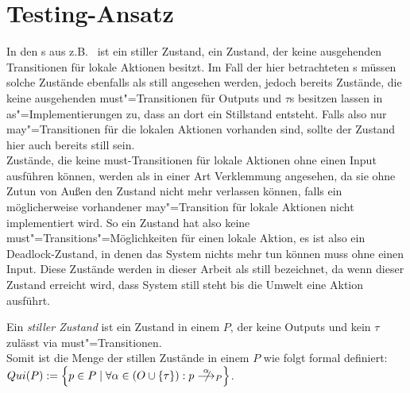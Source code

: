 \section{Testing-Ansatz}

In den \EIO{}s aus z.B.~\cite{Schinko2016BA} ist ein stiller Zustand, ein
Zustand, der keine ausgehenden Transitionen für lokale Aktionen besitzt. Im
Fall der hier betrachteten \MEIO{}s müssen solche Zustände ebenfalls als still
angesehen werden, jedoch bereits Zustände, die keine ausgehenden
must"=Transitionen für Outputs und $\tau$s besitzen lassen in
as"=Implementierungen zu, dass an dort ein Stillstand entsteht. Falls also nur
may"=Transitionen für die lokalen Aktionen vorhanden sind, sollte der Zustand
hier auch bereits still sein.\\
Zustände, die keine must-Transitionen für lokale Aktionen ohne einen Input
ausführen können, werden als in einer Art Verklemmung angesehen, da sie ohne
Zutun von Außen den Zustand nicht mehr verlassen können, falls ein
möglicherweise vorhandener may"=Transition für lokale Aktionen nicht
implementiert wird. So ein Zustand hat also keine
must"=Transitions"=Möglichkeiten für einen lokale Aktion, es ist also ein
Deadlock-Zustand, in denen das System nichts mehr tun können muss ohne einen
Input. Diese Zustände werden in dieser Arbeit als still bezeichnet, da wenn
dieser Zustand erreicht wird, dass System still steht bis die Umwelt eine
Aktion ausführt.

\begin{Def}[Stillstand]
  Ein \emph{stiller Zustand} ist ein Zustand in einem \MEIO{} $P$, der keine
  Outputs und kein $\tau$ zulässt via must"=Transitionen.\\
  Somit ist die Menge der stillen Zustände in einem \MEIO{} $P$ wie folgt
  formal definiert: $Qui(P):=\left\{p\in P\mid \forall\alpha\in
  (O\cup\{\tau\}):p \nmust[\alpha]_P\right\}$.
\end{Def}

